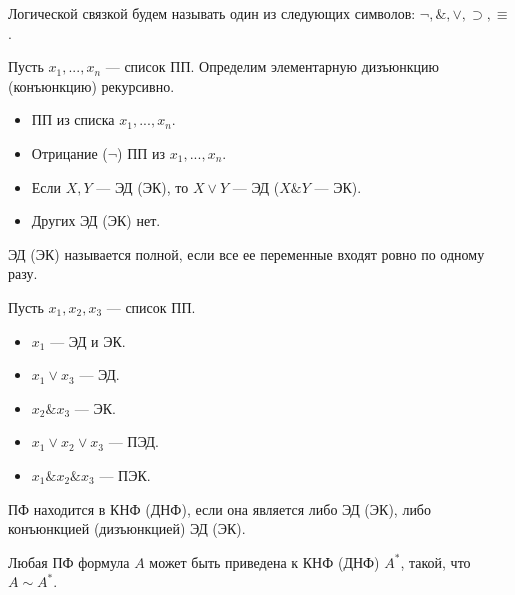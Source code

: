     \begin{Def}
        Логической связкой будем называть один из следующих символов: $\neg, \&, \vee, \supset, \equiv$.
    \end{Def}


    \begin{Def}
        Пусть $x_1, ..., x_n$ --- список ПП. Определим элементарную дизъюнкцию (конъюнкцию) рекурсивно.
        \begin{itemize}
            \item ПП из списка $x_1, ..., x_n$.
            \item Отрицание ($\neg$) ПП из $x_1, ..., x_n$.
            \item Если $X, Y$ --- ЭД (ЭК), то $X \vee Y$ --- ЭД ($X \& Y$ --- ЭК).
            \item Других ЭД (ЭК) нет.
         \end{itemize}
    \end{Def}

    \begin{Def}
        ЭД (ЭК) называется полной, если все ее переменные входят ровно по одному разу.
    \end{Def}

    \begin{Example}
        Пусть $x_1, x_2, x_3$ --- список ПП.
        \begin{itemize}
            \item $x_1$ --- ЭД и ЭК.
            \item $x_1 \vee x_3$ --- ЭД.
            \item $x_2 \& x_3$ --- ЭК.
            \item $x_1 \vee x_2 \vee x_3$ --- ПЭД.
            \item $x_1 \& x_2 \& x_3$ --- ПЭК.
        \end{itemize}
    \end{Example}

    \begin{Def}
        ПФ находится в КНФ (ДНФ), если она является либо ЭД (ЭК), либо конъюнкцией (дизъюнкцией) ЭД (ЭК).
    \end{Def}

    \begin{Thm}
        Любая ПФ формула $A$ может быть приведена к КНФ (ДНФ) $A^*$, такой, что $A \sim A^*$.
    \end{Thm}

